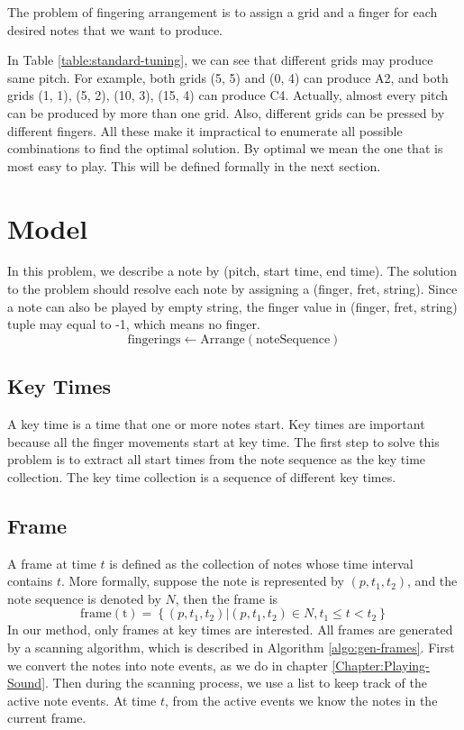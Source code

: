 The problem of fingering arrangement is to assign a grid and a finger for each desired notes that we want to produce. 

In Table \ref{table:standard-tuning}, we can see that different grids may produce same pitch. For example, both grids (5, 5) and (0, 4) can produce A2, and both grids (1, 1), (5, 2), (10, 3), (15, 4) can produce C4. Actually, almost every pitch can be produced by more than one grid. Also, different grids can be pressed by different fingers. All these make it impractical to  enumerate all possible combinations to find the optimal solution. By optimal we mean the one that is most easy to play. This will be defined formally in the next section.

\section{Model}
In this problem, we describe a note by (pitch, start time, end time). The solution to the problem should resolve each note by assigning a (finger, fret, string). Since a note can also be played by empty string, the finger value in (finger, fret, string) tuple may equal to -1, which means no finger. 
\[
\mathrm{fingerings} \gets \mathrm{Arrange}(\mathrm{noteSequence})
\]

\subsection{Key Times}
A key time is a time that one or more notes start. Key times are important because all the finger movements start at key time. The first step to solve this problem is to extract all start times from the note sequence as the key time collection. The key time collection is a sequence of different key times.

\subsection{Frame}
A frame at time $t$ is defined as the collection of notes whose time interval contains $t$. More formally, suppose the note is represented by $(p, t_1, t_2)$, and the note sequence is denoted by $N$, then the frame is \[
\mathrm{frame(t)} = \left\{ (p, t_1, t_2) | (p, t_1, t_2) \in N, t_1 \le t < t_2 \right\}
\]
In our method, only frames at key times are interested. All frames are generated by a scanning algorithm, which is described in Algorithm \ref{algo:gen-frames}. First we convert the notes into note events, as we do in chapter \ref{Chapter:Playing-Sound}. Then during the scanning process, we use a list to keep track of the active note events. At time $t$, from the active events we know the notes in the current frame.

